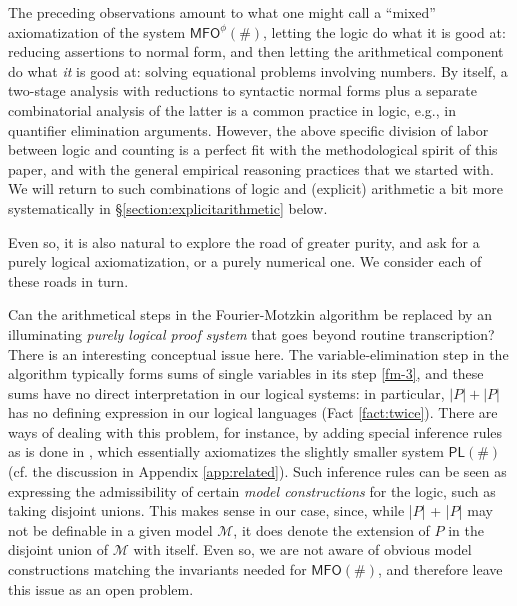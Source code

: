 \documentclass[12pt,oneside,reqno]{amsart}
\theoremstyle{definition}
\begin{document}
The preceding observations amount to what one might call a  ``mixed''  axiomatization of the system $\mathsf{MFO}^\phi(\#)$, letting the logic do what it is good at: reducing assertions to normal form, and then letting the arithmetical  component do what \emph{it} is good at: solving  equational problems involving numbers. By itself, a two-stage 
analysis with reductions to syntactic normal forms 
plus a separate combinatorial analysis of the latter 
is a common practice in logic, e.g., in quantifier 
elimination arguments. However, the above 
specific division of labor between logic and counting is a perfect fit with the methodological spirit of this paper, and with the general empirical reasoning practices that we started with. We will return to such combinations of logic and (explicit) arithmetic a bit more systematically in  \S\ref{section:explicitarithmetic} below.

\vspace{1ex}


Even so, it is also natural to explore the road of greater purity, and ask for a purely logical axiomatization, or a purely numerical one. We consider each of these roads in turn.

\vspace{1ex}

Can the arithmetical steps in the Fourier-Motzkin algorithm be replaced by an illuminating \emph{purely logical proof system} that goes beyond routine transcription? There is an interesting conceptual issue here. The variable-elimination step in the algorithm typically forms sums of single variables in its step \ref{fm-3}, and these sums have no direct interpretation in our logical systems: in particular, $|P| + |P|$ has no defining expression  in our logical languages (Fact \ref{fact:twice}). There are ways of dealing with this problem, for instance, by adding special inference rules as is done in \cite{Ding2020}, which essentially axiomatizes the slightly smaller system $\mathsf{PL}(\#)$ (cf. the discussion in Appendix \ref{app:related}). Such inference rules can be seen as expressing the admissibility of certain \emph{model constructions} for the logic, such as taking disjoint unions. This makes sense in our case, since, while |$P$| + |$P$| may not be definable in a given model $\mathcal{M}$,  it does denote the extension of $P$ in the disjoint union of $\mathcal{M}$ with itself. Even so, we are not aware of obvious model constructions matching the invariants needed for $\mathsf{MFO}(\#)$, and therefore leave this issue as an open problem.
\end{document}
